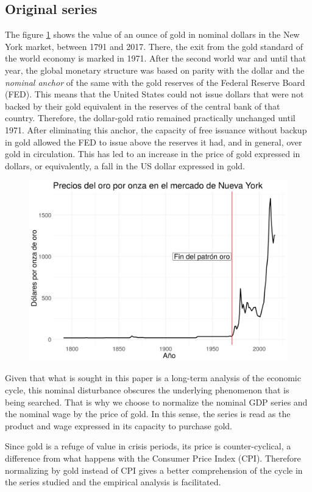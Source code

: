 \documentclass[a4paper]{article}
\begin{document}
\subsection{Original series}

The figure \ref{fig:oro} shows the value of an ounce of gold in nominal dollars in the New York market, between 1791 and 2017. There, the exit from the gold standard of the world economy is marked in 1971. After the second world war and until that year, the global monetary structure was based on parity with the dollar and the \textit{nominal anchor} of the same with the gold reserves of the Federal Reserve Board (FED). This means that the United States could not issue dollars that were not backed by their gold equivalent in the reserves of the central bank of that country. Therefore, the dollar-gold ratio remained practically unchanged until 1971. After eliminating this anchor, the capacity of free issuance without backup in gold allowed the FED to issue above the reserves it had, and in general, over gold in circulation. This has led to an increase in the price of gold expressed in dollars, or equivalently, a fall in the US dollar expressed in gold.

\begin{figure}[H]
	\centering
	\includegraphics[width=0.75\linewidth]{oro.png}
	 \caption{}\label{fig:oro}
\end{figure}

Given that what is sought in this paper is a long-term analysis of the economic cycle, this nominal disturbance obscures the underlying phenomenon that is being searched. That is why we choose to normalize the nominal GDP series and the nominal wage by the price of gold. In this sense, the series is read as the product and wage expressed in its capacity to purchase gold.


Since gold is a refuge of value in crisis periods, its price is counter-cyclical, a difference from what happens with the Consumer Price Index (CPI). Therefore normalizing by gold instead of CPI gives a better comprehension of the cycle in the series studied and the empirical analysis is facilitated.
\end{document}
